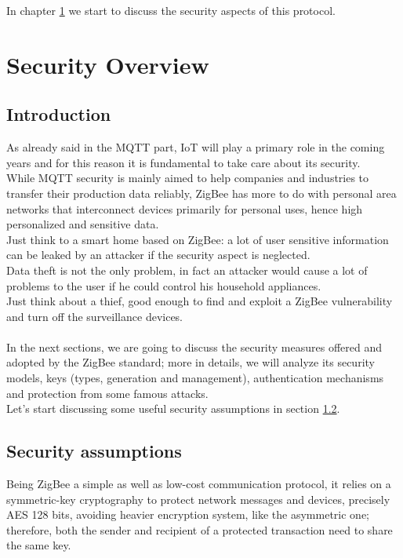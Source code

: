 \documentclass[12pt]{report}
\begin{document}
{{\begin{itemize}
\end{itemize}
\bigskip
In chapter \ref{chap:zigbeesecchap} we start to discuss the security aspects of this protocol.\\

\chapter{Security Overview}
\label{chap:zigbeesecchap}

\section{Introduction}
\bigskip
As already said in the MQTT part, IoT will play a primary role in the coming years and for this reason it is fundamental to take care about its security.\\
While MQTT security is mainly aimed to help companies and industries to transfer their production data reliably, ZigBee has more to do with personal area networks that interconnect devices primarily for personal uses, hence high personalized and sensitive data.\\
Just think to a smart home based on ZigBee: a lot of user sensitive information can be leaked by an attacker if the security aspect is neglected.\\
Data theft is not the only problem, in fact an attacker would cause a lot of problems to the user if he could control his household appliances.\\
Just think about a thief, good enough to find and exploit a ZigBee vulnerability and turn off the surveillance devices.\\\\

In the next sections, we are going to discuss the security measures offered and adopted by the ZigBee standard; more in details, we will analyze its security models, keys (types, generation and management), authentication mechanisms and protection from some famous attacks.\\

Let's start discussing some useful security assumptions in section \ref{sec:zigbeesecassumptions}.


\clearpage
\section{Security assumptions}
\label{sec:zigbeesecassumptions}
\bigskip
Being ZigBee a simple as well as low-cost communication protocol, it relies on a symmetric-key cryptography to protect network messages and devices, precisely AES 128 bits, avoiding heavier encryption system, like the asymmetric one; therefore, both the sender and recipient of a protected transaction need to share the same key.\\

}}
\end{document}
